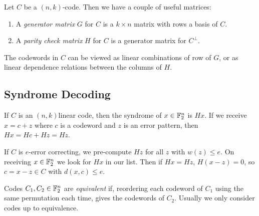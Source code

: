 \documentclass[10pt,a4paper]{article}
\begin{document}
Let $C$ be a $(n,k)$-code. Then we have a couple of useful matrices:
\begin{enumerate}
\item A \emph{generator matrix} $G$ for $C$ is a $k\times n$ matrix with rows a basis of $C$.
\item A \emph{parity check matrix} $H$ for $C$ is a generator matrix for $C^\bot$.
\end{enumerate}
The codewords in $C$ can be viewed as linear combinations of row of $G$, or as linear dependence relations between the columns of $H$.

\subsection{Syndrome Decoding}
If $C$ is an $(n,k)$linear code, then the syndrome of $x \in \mathbb{F}^n_2$ is $Hx$. If we receive $x = c+z$ where $c$ is a codeword and $z$ is an error pattern, then $Hx = Hc+Hz = Hz$.

If $C$ is $e$-error correcting, we pre-compute $Hz$ for all $z$ with $w(z) \leq e$. On receiving $x \in \mathbb{F}_2^n$ we look for $Hx$ in our list. Then if $Hx = Hz$, $H(x-z) = 0$, so $c = x-z \in C$ with $d(x,c) \leq e$.

Codes $C_1, C_2 \in \mathbb{F}_2^n$ are \emph{equivalent} if, reordering each codeword of $C_1$ using the same permutation each time, gives the codewords of $C_2$. Usually we only consider codes up to equivalence.
\end{document}
